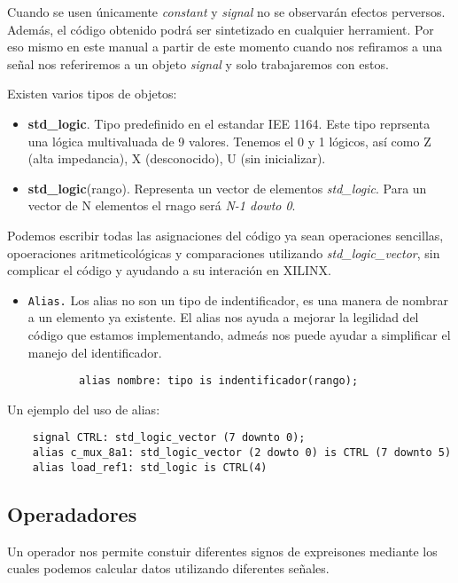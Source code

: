Cuando se usen únicamente \textit{constant} y \textit{signal} no se observarán efectos perversos. Además, el código obtenido podrá ser sintetizado en cualquier herramient. Por eso mismo en este manual a partir de este momento cuando nos refiramos a una señal nos referiremos a un objeto \textit{signal} y solo trabajaremos con estos. 

Existen varios tipos de objetos: 

\begin{itemize}
    \item \textbf{std\_logic}. Tipo predefinido en el estandar IEE 1164. Este tipo reprsenta una lógica multivaluada de 9 valores. Tenemos el 0 y 1 lógicos, así como Z (alta impedancia), X (desconocido), U (sin inicializar).
    \item  \textbf{std\_logic}(rango). Representa un vector de elementos \textit{std\_logic}. Para un vector de N elementos el rnago será \textit{N-1 dowto 0}. 
\end{itemize}
Podemos escribir todas las asignaciones del código ya sean operaciones sencillas, opoeraciones aritmeticológicas y comparaciones utilizando \textit{std\_logic\_vector}, sin complicar el código y ayudando a su interación en XILINX. 

\begin{itemize}
    \item \texttt{Alias.} Los alias no son un tipo de indentificador, es una manera de nombrar a un elemento ya existente. El alias nos ayuda a mejorar la legilidad del código que estamos implementando, admeás nos puede ayudar a simplificar el manejo del identificador. 
    \begin{lstlisting}
        alias nombre: tipo is indentificador(rango);
    \end{lstlisting}
\end{itemize}
Un ejemplo del uso de alias: 

\begin{lstlisting}
    signal CTRL: std_logic_vector (7 downto 0); 
    alias c_mux_8a1: std_logic_vector (2 dowto 0) is CTRL (7 downto 5)
    alias load_ref1: std_logic is CTRL(4)
\end{lstlisting}

\subsection{Operadadores}

Un operador nos permite constuir diferentes signos de expreisones mediante los cuales podemos calcular datos utilizando diferentes señales. 

